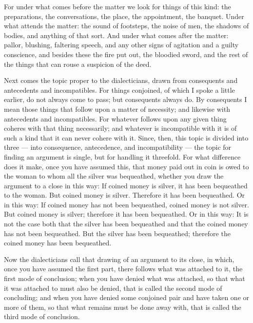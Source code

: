 For under what comes before the matter we look for things of this kind: the preparations, the conversations, the place, the appointment, the banquet. Under what attends the matter: the sound of footsteps, the noise of men, the shadows of bodies, and anything of that sort. And under what comes after the matter: pallor, blushing, faltering speech, and any other signs of agitation and a guilty conscience, and besides these the fire put out, the bloodied sword, and the rest of the things that can rouse a suspicion of the deed.

 Next comes the topic proper to the dialecticians, drawn from consequents and antecedents and incompatibles. For things conjoined, of which I spoke a little earlier, do not always come to pass; but consequents always do. By consequents I mean those things that follow upon a matter of necessity; and likewise with antecedents and incompatibles. For whatever follows upon any given thing coheres with that thing necessarily; and whatever is incompatible with it is of such a kind that it can never cohere with it. Since, then, this topic is divided into three — into consequence, antecedence, and incompatibility — the topic for finding an argument is single, but for handling it threefold. For what difference does it make, once you have assumed this, that money paid out in coin is owed to the woman to whom all the silver was bequeathed, whether you draw the argument to a close in this way: If coined money is silver, it has been bequeathed to the woman. But coined money is silver. Therefore it has been bequeathed. Or in this way: If coined money has not been bequeathed, coined money is not silver. But coined money is silver; therefore it has been bequeathed. Or in this way: It is not the case both that the silver has been bequeathed and that the coined money has not been bequeathed. But the silver has been bequeathed; therefore the coined money has been bequeathed.

 Now the dialecticians call that drawing of an argument to its close, in which, once you have assumed the first part, there follows what was attached to it, the first mode of conclusion; when you have denied what was attached, so that what it was attached to must also be denied, that is called the second mode of concluding; and when you have denied some conjoined pair and have taken one or more of them, so that what remains must be done away with, that is called the third mode of conclusion.

